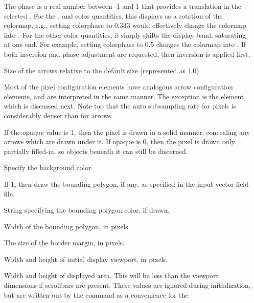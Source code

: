 \begin{description}
 The phase is a real number between -1 and 1 that provides a translation
 in the selected .  For the , 
 and  color quantities, this displays as a rotation of the
 colormap, e.g., setting colorphase to 0.333 would effectively
 change the  colormap into
 .  For the other color quantities, it simply
 shifts the display band, saturating at one end.  For example, setting
 colorphase to 0.5 changes the  colormap into
 .  If both inversion and phase adjustment are
 requested, then inversion is applied first.
\item[\optkey{arrow,size}]
 Size of the arrows relative to the default size (represented as 1.0).
\item[\optkey{pixel,\ldots}]
 Most of the pixel configuration elements have analogous arrow
 configuration elements, and are interpreted in the same manner.  The
 exception is the  element, which is discussed next.
 Note too that the auto subsampling rate for pixels is considerably
 denser than for arrows.
\item[\optkey{pixel,opaque}]
 If the opaque value is 1, then the pixel is drawn in a solid manner,
 concealing any arrows which are drawn under it.  If opaque is 0, then
 the pixel is drawn only partially filled-in, so objects beneath it can
 still be discerned.
\item[\optkey{misc,background}]
 Specify the background color.
\item[\optkey{misc,drawboundary}]
 If 1, then draw the bounding polygon, if any, as
 specified in the input vector field file.
\item[\optkey{misc,boundarycolor}]
 String specifying the bounding polygon color, if drawn.
\item[\optkey{misc,boundarywidth}]
 Width of the bounding polygon, in pixels.
\item[\optkey{misc,margin}]
 The size of the border margin, in pixels.
\item[\optkey{misc,defaultwindowwidth}, \optkey{misc,defaultwindowheight}]
 Width and height of initial display viewport, in pixels.
\item[\optkey{misc,width}, \optkey{misc,height}]
 Width and height of displayed area.  This will be less than the
 viewport dimensions if scrollbars are present.  These values are
 ignored during  initialization, but are written out by the
  command as a convenience for the

\end{description}
